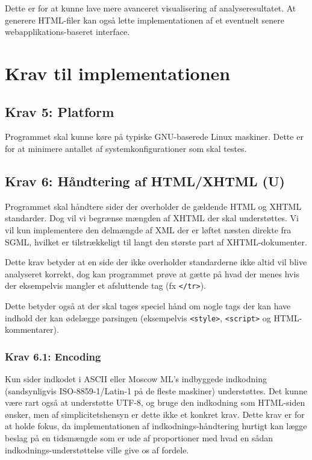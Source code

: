 \documentclass[a4paper,oneside,article]{memoir}
\begin{document}
Dette er for at kunne lave mere avanceret visualisering af
analyseresultatet. At generere HTML-filer kan også lette
implementationen af et eventuelt senere web\-appli\-kations-baseret
interface.

\section{Krav til implementationen}

\subsection{Krav 5: Platform}
Programmet skal kunne køre på typiske GNU-baserede Linux
maskiner. Dette er for at minimere antallet af systemkonfigurationer
som skal testes.

\subsection{Krav 6: Håndtering af HTML/XHTML (U)}
Programmet skal håndtere sider der overholder de gældende HTML
og XHTML standarder. Dog vil vi begrænse mængden af XHTML der skal
understøttes. Vi vil kun implementere den delmængde af XML der er
løftet næsten direkte fra SGML, hvilket er tilstrækkeligt til langt
den største part af XHTML-dokumenter.

Dette krav betyder at en side der ikke overholder standarderne
ikke altid vil blive analyseret korrekt, dog kan programmet prøve at
gætte på hvad der menes hvis der eksempelvis mangler et afsluttende
tag (fx \texttt{</tr>}).

Dette betyder også at der skal tages speciel hånd om nogle tags der
kan have indhold der kan ødelægge parsingen (eksempelvis
\texttt{<style>}, \texttt{<script>} og HTML-kommentarer).

\subsubsection{Krav 6.1: Encoding}

Kun sider indkodet i ASCII eller Moscow ML's indbyggede indkodning
(sandsynligvis ISO-8859-1/Latin-1 på de fleste maskiner)
understøttes. Det kunne være rart også at understøtte UTF-8, og bruge
den indkodning som HTML-siden ønsker, men af simplicitetshensyn er
dette ikke et konkret krav. Dette krav er for at holde fokus, da
implementationen af indkodnings-håndtering hurtigt kan lægge beslag på
en tidsmængde som er ude af proportioner med hvad en sådan
indkodnings-understøttelse ville give os af fordele.
\end{document}
